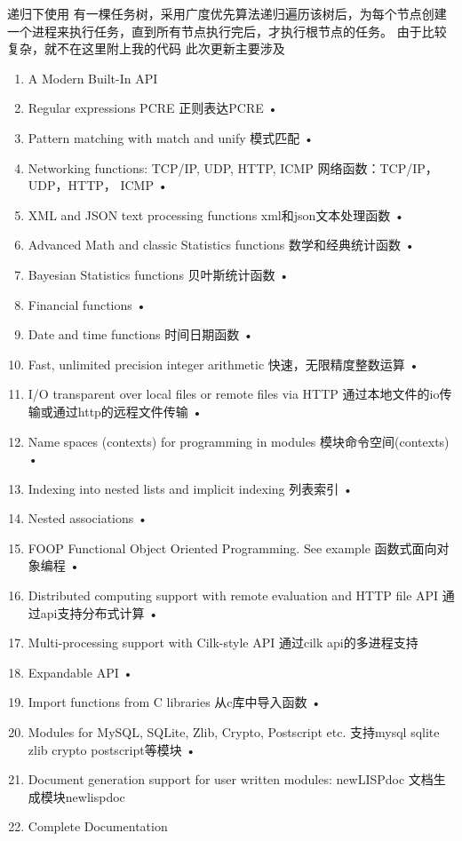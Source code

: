 \documentclass[cn,11pt]{elegantbook}
\begin{document}
递归下使用
有一棵任务树，采用广度优先算法递归遍历该树后，为每个节点创建一个进程来执行任务，直到所有节点执行完后，才执行根节点的任务。
由于比较复杂，就不在这里附上我的代码
此次更新主要涉及
\begin{enumerate}
  \item A Modern Built-In API
  \item Regular expressions PCRE 正则表达PCRE
  • \item Pattern matching with match and unify 模式匹配 
  • \item Networking functions: TCP/IP, UDP, HTTP, ICMP 网络函数：TCP/IP， UDP，HTTP， ICMP
  • \item XML and JSON text processing functions xml和json文本处理函数
  • \item Advanced Math and classic Statistics functions 数学和经典统计函数
  • \item Bayesian Statistics functions 贝叶斯统计函数
  • \item Financial functions  
  • \item Date and time functions  时间日期函数
  • \item Fast, unlimited precision integer arithmetic 快速，无限精度整数运算 
  • \item I/O transparent over local files or remote files via HTTP  通过本地文件的io传输或通过http的远程文件传输
  • \item Name spaces (contexts) for programming in modules  模块命令空间(contexts)
  • \item Indexing into nested lists and implicit indexing  列表索引
  • \item Nested associations 
  • \item FOOP Functional Object Oriented Programming. See example  函数式面向对象编程
  • \item Distributed computing support with remote evaluation and HTTP file API  通过api支持分布式计算
  • \item Multi-processing support with Cilk-style API 通过cilk api的多进程支持
  \item Expandable API
  • \item Import functions from C libraries  从c库中导入函数
  • \item Modules for MySQL, SQLite, Zlib, Crypto, Postscript etc. 支持mysql sqlite zlib crypto postscript等模块 
  • \item Document generation support for user written modules: newLISPdoc 文档生成模块newlispdoc
  \item Complete Documentation

\end{enumerate}
\end{document}

